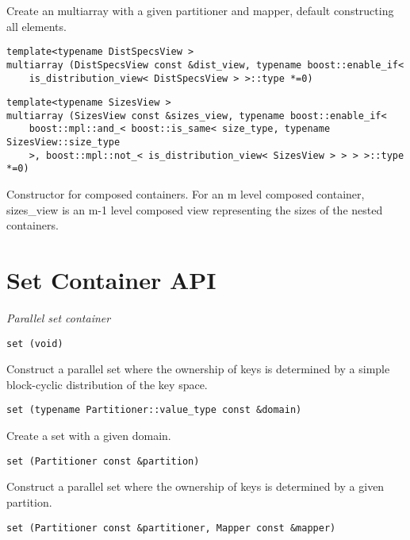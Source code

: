 Create an multiarray with a given partitioner and mapper, default constructing all elements. 
 
\begin{verbatim}
template<typename DistSpecsView >
multiarray (DistSpecsView const &dist_view, typename boost::enable_if< 
    is_distribution_view< DistSpecsView > >::type *=0)
\end{verbatim}
 
\begin{verbatim}
template<typename SizesView >
multiarray (SizesView const &sizes_view, typename boost::enable_if< 
    boost::mpl::and_< boost::is_same< size_type, typename SizesView::size_type
    >, boost::mpl::not_< is_distribution_view< SizesView > > > >::type *=0)
\end{verbatim}

Constructor for composed containers. For an m level composed container, sizes\_view is an m-1 level composed view representing the sizes of the nested containers. 


\section{ Set Container API } \label{sec-set-cont}

\emph{Parallel set container}

\begin{verbatim}
set (void)
\end{verbatim}

Construct a parallel set where the ownership of keys is determined by a simple block-cyclic distribution of the key space. 
 
\begin{verbatim}
set (typename Partitioner::value_type const &domain)
\end{verbatim}

Create a set with a given domain.
 
\begin{verbatim}
set (Partitioner const &partition)
\end{verbatim}

Construct a parallel set where the ownership of keys is determined by a given partition. 
 
\begin{verbatim}
set (Partitioner const &partitioner, Mapper const &mapper)
\end{verbatim}

